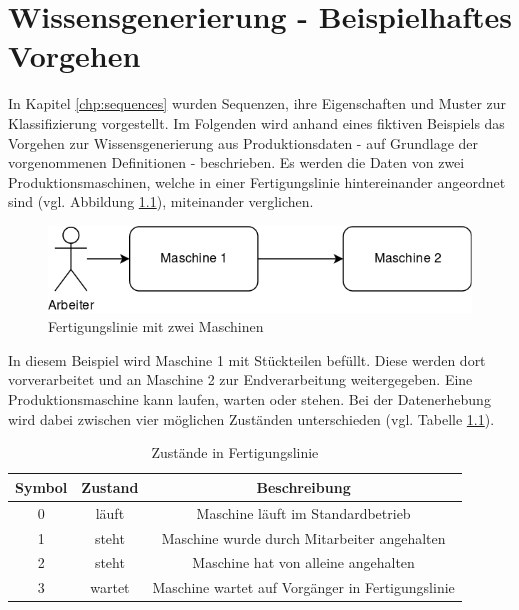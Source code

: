 \chapter{Wissensgenerierung - Beispielhaftes Vorgehen}
\label{chp:procedure}
In Kapitel \ref{chp:sequences} wurden Sequenzen, ihre Eigenschaften und Muster zur Klassifizierung vorgestellt. Im Folgenden wird anhand eines fiktiven Beispiels das Vorgehen zur Wissensgenerierung aus Produktionsdaten - auf Grundlage der vorgenommenen Definitionen - beschrieben. Es werden die Daten von zwei Produktionsmaschinen, welche in einer Fertigungslinie hintereinander angeordnet sind (vgl. Abbildung \ref{fig:procedure-production-line}), miteinander verglichen.

\begin{figure}[H]
	\centering
	\includegraphics[scale=0.40]{images/procedure/production-line}
	\caption{Fertigungslinie mit zwei Maschinen}
	\label{fig:procedure-production-line}
\end{figure}

In diesem Beispiel wird Maschine 1 mit Stückteilen befüllt. Diese werden dort vorverarbeitet und an Maschine 2 zur Endverarbeitung weitergegeben. Eine Produktionsmaschine kann laufen, warten oder stehen. Bei der Datenerhebung wird dabei zwischen vier möglichen Zuständen unterschieden (vgl. Tabelle \ref{tab:procedure-status-in-production}). 

\begin{table}
	\begin{center}
		\begin{tabular}{|c c c|} 
			\hline
			Symbol & Zustand & Beschreibung \\
			\hline\hline
			0 & läuft & Maschine läuft im Standardbetrieb \\ 
			\hline
			1 & steht & Maschine wurde durch Mitarbeiter angehalten \\
			\hline
			2 & steht & Maschine hat von alleine angehalten \\
			\hline
			3 & wartet & Maschine wartet auf Vorgänger in Fertigungslinie \\
			\hline
		\end{tabular}
		\caption{Zustände in Fertigungslinie}
		\label{tab:procedure-status-in-production}
	\end{center}
\end{table}

